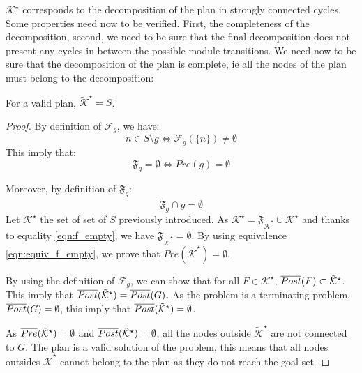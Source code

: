 $\mathcal{K}^\star$ corresponds to the decomposition of the plan in strongly connected cycles.
Some properties need now to be verified. First, the completeness of the decomposition, second, we need to be sure that the final decomposition does not present any cycles in between the possible module transitions.
We need now to be sure that the decomposition of the plan is complete, ie all the nodes of the plan must belong to the decomposition:
\begin{prop}
For a valid plan, $\tilde{\mathcal{K}}^\star = S$.
\end{prop}
\begin{proof}
By definition of $\mathcal{F}_g$, we have:
\begin{equation}
n \in S \setminus g \Leftrightarrow \mathcal{F}_g(\{n\}) \neq \emptyset
\end{equation}
This imply that:
\begin{equation} \label{eqn:equiv_f_empty}
\mathfrak{F}_g = \emptyset \Leftrightarrow Pre(g) = \emptyset
\end{equation}

Moreover, by definition of $\mathfrak{F}_g$:
\begin{equation} \label{eqn:f_empty}
\tilde{\mathfrak{F}}_g \cap g = \emptyset
\end{equation}
Let $\mathcal{K}^\star$ the set of set of $S$ previously introduced.
As $\mathcal{K}^\star = \mathfrak{F}_{\tilde{\mathcal{K}}^\star} \cup \mathcal{K}^\star$ and thanks to equality \ref{eqn:f_empty}, we have $\mathfrak{F}_{\tilde{\mathcal{K}}^\star} = \emptyset$.  
By using equivalence \ref{eqn:equiv_f_empty}, we prove that $Pre(\tilde{\mathcal{K}}^\star) = \emptyset$.

By using the definition of $\mathcal{F}_g$,
we can show that for all $F \in \mathcal{K}^\star$, $\overline{Post} (F) \subset \tilde{\mathcal{K}}^\star$.
This imply that $\overline{Post} (\tilde{\mathcal{K}}^\star) = \overline{Post} (G)$.
As the problem is a terminating problem, $\overline{Post} (G) = \emptyset$, this imply that 
$\overline{Post} (\tilde{\mathcal{K}}^\star)  = \emptyset$.

As $\overline{Pre} (\tilde{\mathcal{K}}^\star)  = \emptyset$ and $\overline{Post} (\tilde{\mathcal{K}}^\star)  = \emptyset$, all the nodes outside $\tilde{\mathcal{K}}^\star$ are not connected to $G$.
The plan is a valid solution of the problem, this means that all nodes outsides $\tilde{\mathcal{K}}^\star$ cannot belong to the plan as they do not reach the goal set.
\end{proof}

